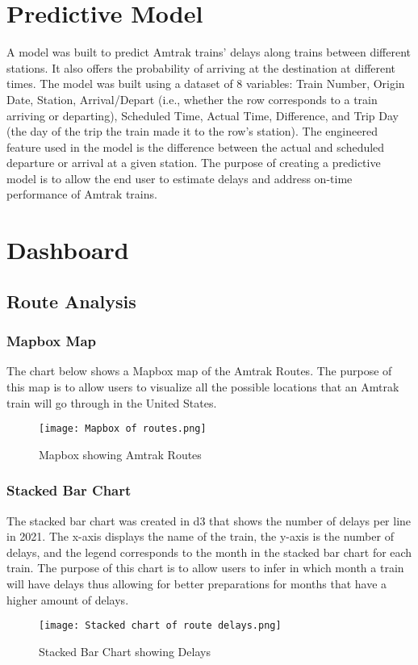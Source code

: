 \documentclass[runningheads]{llncs}
\begin{document}
\section{Predictive Model}
A model was built to predict Amtrak trains’ delays along trains between different stations. It also offers the probability of arriving at the destination at different times. The model was built using a dataset of 8 variables: Train Number, Origin Date, Station, Arrival/Depart (i.e., whether the row corresponds to a train arriving or departing), Scheduled Time, Actual Time, Difference, and Trip Day (the day of the trip the train made it to the row’s station). The engineered feature used in the model is the difference between the actual and scheduled departure or arrival at a given station. The purpose of creating a predictive model is to allow the end user to estimate delays and address on-time performance of Amtrak trains.

\section{Dashboard}
\subsection{Route Analysis}
\subsubsection{Mapbox Map}
The chart below shows a Mapbox map of the Amtrak Routes. The purpose of this map is to allow users to visualize all the possible locations that an Amtrak train will go through in the United States.
\begin{figure}
    \centering
    \texttt{[image: Mapbox of routes.png]}
    \caption{Mapbox showing Amtrak Routes}
    \label{fig:1}
\end{figure}
\subsubsection{Stacked Bar Chart}
The stacked bar chart was created in d3 that shows the number of delays per line in 2021. The x-axis displays the name of the train, the y-axis is the number of delays, and the legend corresponds to the month in the stacked bar chart for each train. The purpose of this chart is to allow users to infer in which month a train will have delays thus allowing for better preparations for months that have a higher amount of delays.
\begin{figure}
    \centering
    \texttt{[image: Stacked chart of route delays.png]}
    \caption{Stacked Bar Chart showing Delays}
    \label{fig:2}
\end{figure}
\end{document}
